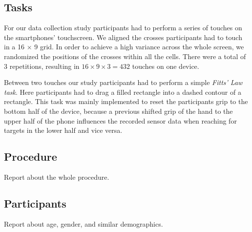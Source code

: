 \subsection{Tasks}
\label{sec:tasks}
For our data collection study participants had to perform a series of touches on the smartphones' touchscreen. 
We aligned the crosses participants had to touch in a 16 $ \times $ 9 grid. 
In order to achieve a high variance across the whole screen, we randomized the positions of the crosses within all the cells.
There were a total of 3 repetitions, resulting in $ 16 \times 9 \times 3 = 432 $ touches on one device.

Between two touches our study participants had to perform a simple \textit{Fitts' Law task}. 
Here participants had to drag a filled rectangle into a dashed contour of a rectangle.
This task was mainly implemented to reset the participants grip to the bottom half of the device, because a previous shifted grip of the hand to the upper half of the phone influences the recorded sensor data when reaching for targets in the lower half and vice versa. 
\subsection{Procedure}
Report about the whole procedure.
\subsection{Participants}
Report about age, gender, and similar demographics.
